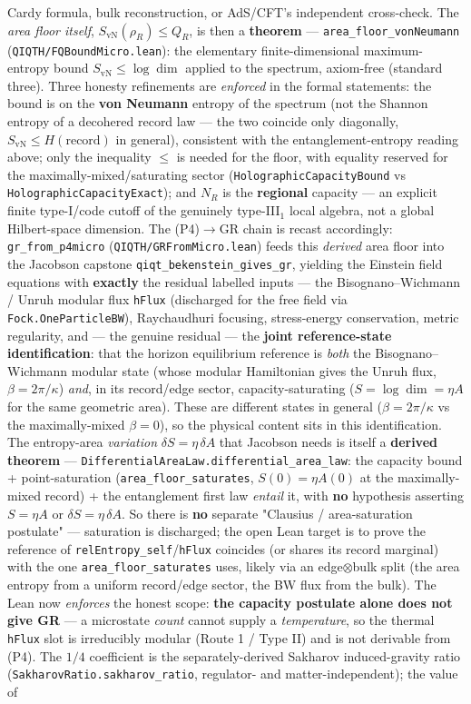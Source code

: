 \documentclass[11pt,a4paper]{article}
\begin{document}
Cardy formula, bulk reconstruction, or AdS/CFT's independent cross-check. The \emph{area floor itself}, $S_{\mathrm{vN}}(\rho_R) \le Q_R$, is then a \textbf{theorem} — \texttt{area\_floor\_vonNeumann} (\texttt{QIQTH/FQBoundMicro.lean}): the elementary finite-dimensional maximum-entropy bound $S_{\mathrm{vN}} \le \log\dim$ applied to the spectrum, axiom-free (standard three). Three honesty refinements are \emph{enforced} in the formal statements: the bound is on the \textbf{von Neumann} entropy of the spectrum (not the Shannon entropy of a decohered record law — the two coincide only diagonally, $S_{\mathrm{vN}}\le H(\text{record})$ in general), consistent with the entanglement-entropy reading above; only the inequality $\le$ is needed for the floor, with equality reserved for the maximally-mixed/saturating sector (\texttt{HolographicCapacityBound} vs \texttt{HolographicCapacityExact}); and $N_R$ is the \textbf{regional} capacity — an explicit finite type-I/code cutoff of the genuinely type-III$_1$ local algebra, not a global Hilbert-space dimension. The (P4)$\to$GR chain is recast accordingly: \texttt{gr\_from\_p4micro} (\texttt{QIQTH/GRFromMicro.lean}) feeds this \emph{derived} area floor into the Jacobson capstone \texttt{qiqt\_bekenstein\_gives\_gr}, yielding the Einstein field equations with \textbf{exactly} the residual labelled inputs — the Bisognano–Wichmann / Unruh modular flux \texttt{hFlux} (discharged for the free field via \texttt{Fock.OneParticleBW}), Raychaudhuri focusing, stress-energy conservation, metric regularity, and — the genuine residual — the \textbf{joint reference-state identification}: that the horizon equilibrium reference is \emph{both} the Bisognano–Wichmann modular state (whose modular Hamiltonian gives the Unruh flux, $\beta = 2\pi/\kappa$) \emph{and}, in its record/edge sector, capacity-saturating ($S = \log\dim = \eta A$ for the same geometric area). These are different states in general ($\beta = 2\pi/\kappa$ vs the maximally-mixed $\beta = 0$), so the physical content sits in this identification. The entropy-area \emph{variation} $\delta S = \eta\,\delta A$ that Jacobson needs is itself a \textbf{derived theorem} — \texttt{DifferentialAreaLaw.differential\_area\_law}: the capacity bound + point-saturation (\texttt{area\_floor\_saturates}, $S(0)=\eta A(0)$ at the maximally-mixed record) + the entanglement first law \emph{entail} it, with \textbf{no} hypothesis asserting $S=\eta A$ or $\delta S=\eta\,\delta A$. So there is \textbf{no} separate "Clausius / area-saturation postulate" — saturation is discharged; the open Lean target is to prove the reference of \texttt{relEntropy\_self}/\texttt{hFlux} coincides (or shares its record marginal) with the one \texttt{area\_floor\_saturates} uses, likely via an edge$\otimes$bulk split (the area entropy from a uniform record/edge sector, the BW flux from the bulk). The Lean now \emph{enforces} the honest scope: \textbf{the capacity postulate alone does not give GR} — a microstate \emph{count} cannot supply a \emph{temperature}, so the thermal \texttt{hFlux} slot is irreducibly modular (Route 1 / Type II) and is not derivable from (P4). The $1/4$ coefficient is the separately-derived Sakharov induced-gravity ratio (\texttt{SakharovRatio.sakharov\_ratio}, regulator- and matter-independent); the value of 
\end{document}
